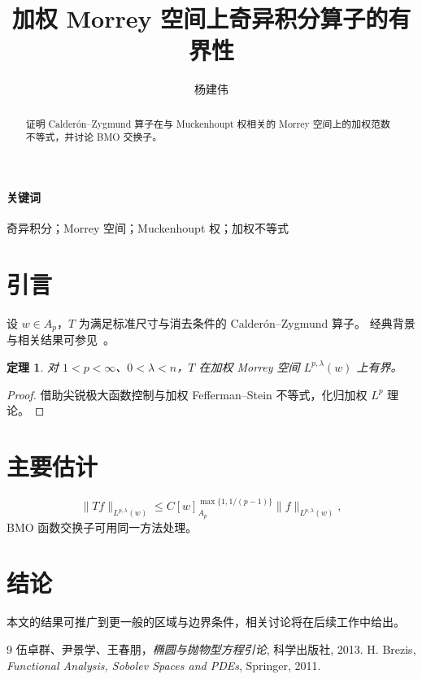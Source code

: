 \documentclass[UTF8,fontset=fandol,11pt]{ctexart}
\title{加权 Morrey 空间上奇异积分算子的有界性}
\author{杨建伟}
\date{}
\newtheorem{theorem}{定理}[section]
\begin{document}
\maketitle
\begin{abstract}
证明 Calderón–Zygmund 算子在与 Muckenhoupt 权相关的 Morrey 空间上的加权范数不等式，并讨论 BMO 交换子。
\end{abstract}
\paragraph{关键词} 奇异积分；Morrey 空间；Muckenhoupt 权；加权不等式

\section{引言}
设 $w\in A_p$，$T$ 为满足标准尺寸与消去条件的 Calderón–Zygmund 算子。
经典背景与相关结果可参见~\cite{Evans,Brezis}。

\begin{theorem}
对 $1<p<\infty$、$0<\lambda<n$，$T$ 在加权 Morrey 空间 $L^{p,\lambda}(w)$ 上有界。
\end{theorem}

\begin{proof}
借助尖锐极大函数控制与加权 Fefferman–Stein 不等式，化归加权 $L^p$ 理论。
\end{proof}

\section{主要估计}
\begin{equation}
\|Tf\|_{L^{p,\lambda}(w)}\le C[w]_{A_p}^{\max\{1,1/(p-1)\}}\|f\|_{L^{p,\lambda}(w)},
\end{equation}
BMO 函数交换子可用同一方法处理。

\section{结论}
本文的结果可推广到更一般的区域与边界条件，相关讨论将在后续工作中给出。

\begin{thebibliography}{9}
 伍卓群、尹景学、王春朋，\emph{椭圆与抛物型方程引论}, 科学出版社, 2013.
 H. Brezis, \emph{Functional Analysis, Sobolev Spaces and PDEs}, Springer, 2011.
\end{thebibliography}
\end{document}
